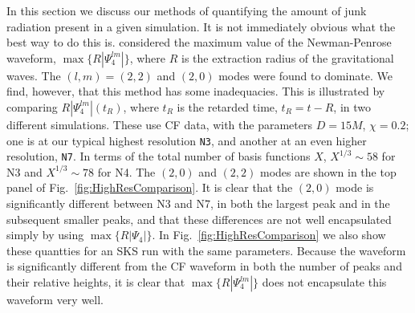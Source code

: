 In this section we discuss our methods of
quantifying the amount of junk radiation present in a given
simulation. It is not immediately obvious what the best way to do this
is.  \cite{Lovelace2009} considered the
maximum value of the Newman-Penrose waveform,
$\max\{R|\Psi_4^{lm}|\}$, where $R$ is the extraction radius of the gravitational waves.  The
  $(l,m)=(2,2)$ and $(2,0)$ modes were found to dominate. We find,
  however, that this method has some inadequacies. This is illustrated
  by comparing $R|\Psi_4^{lm}|(t_R)$, where $t_R$ is the retarded time,
  $t_R=t-R$, in two different simulations. These use CF data, with the parameters $D=15M$, $\chi=0.2$; one is at our
  typical highest resolution {\tt N3}, and another at an even higher
  resolution, {\tt N7}. In terms of the total number of basis
    functions $X$, $X^{1/3}\sim58$ for N3 and $X^{1/3}\sim78$ for
    N4. The $(2,0)$ and $(2,2)$ modes are shown in the top panel of
  Fig.~\ref{fig:HighResComparison}. It is clear that the $(2,0)$ mode
  is significantly different between N3 and N7, in both the
  largest peak and in the subsequent smaller peaks, and that these
  differences are not well encapsulated simply by using
  $\max\{R|\Psi_4|\}$. In Fig.~\ref{fig:HighResComparison} we also
  show these quantties for an SKS run with the same parameters. Because
  the waveform is significantly different from the CF waveform in both the
  number of peaks and their relative heights, it is clear that
  $\max\{R|\Psi_4^{lm}|\}$ does not encapsulate this waveform very well.


